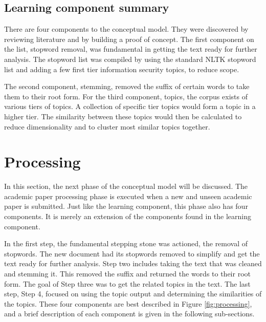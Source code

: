 \subsection{Learning component summary}

There are four components to the conceptual model. They were discovered by reviewing literature and by building a proof of concept. The first component on the list, stopword removal, was fundamental in getting the text ready for further analysis. The stopword list was compiled by using the standard NLTK stopword list and adding a few first tier information security topics, to reduce scope.

The second component, stemming, removed the suffix of certain words to take them to their root form. For the third component, topics, the corpus exists of various tiers of topics. A collection of specific tier topics would form a topic in a higher tier. The similarity between these topics would then be calculated to reduce dimensionality and to cluster most similar topics together.

\section{Processing}

In this section, the next phase of the conceptual model will be discussed. The academic paper processing phase is executed when a new and unseen academic paper is submitted. Just like the learning component, this phase also has four components. It is merely an extension of the components found in the learning component.

In the first step, the fundamental stepping stone was actioned, the removal of stopwords. The new document had its stopwords removed to simplify and get the text ready for further analysis. Step two includes taking the text that was cleaned and stemming it. This removed the suffix and returned the words to their root form. The goal of Step three was to get the related topics in the text. The last step, Step 4, focused on using the topic output and determining the similarities of the topics. These four components are best described in Figure \ref{fig:processing}, and a brief description of each component is given in the following sub-sections.

